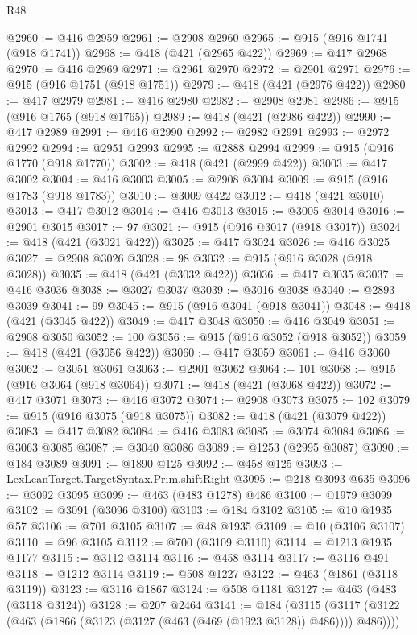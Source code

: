 \begin{lexlean}{R48}
\begin{coremodule}
@2960 := @416 @2959
@2961 := @2908 @2960
@2965 := @915 (@916 @1741 (@918 @1741))
@2968 := @418 (@421 (@2965 @422))
@2969 := @417 @2968
@2970 := @416 @2969
@2971 := @2961 @2970
@2972 := @2901 @2971
@2976 := @915 (@916 @1751 (@918 @1751))
@2979 := @418 (@421 (@2976 @422))
@2980 := @417 @2979
@2981 := @416 @2980
@2982 := @2908 @2981
@2986 := @915 (@916 @1765 (@918 @1765))
@2989 := @418 (@421 (@2986 @422))
@2990 := @417 @2989
@2991 := @416 @2990
@2992 := @2982 @2991
@2993 := @2972 @2992
@2994 := @2951 @2993
@2995 := @2888 @2994
@2999 := @915 (@916 @1770 (@918 @1770))
@3002 := @418 (@421 (@2999 @422))
@3003 := @417 @3002
@3004 := @416 @3003
@3005 := @2908 @3004
@3009 := @915 (@916 @1783 (@918 @1783))
@3010 := @3009 @422
@3012 := @418 (@421 @3010)
@3013 := @417 @3012
@3014 := @416 @3013
@3015 := @3005 @3014
@3016 := @2901 @3015
@3017 := 97
@3021 := @915 (@916 @3017 (@918 @3017))
@3024 := @418 (@421 (@3021 @422))
@3025 := @417 @3024
@3026 := @416 @3025
@3027 := @2908 @3026
@3028 := 98
@3032 := @915 (@916 @3028 (@918 @3028))
@3035 := @418 (@421 (@3032 @422))
@3036 := @417 @3035
@3037 := @416 @3036
@3038 := @3027 @3037
@3039 := @3016 @3038
@3040 := @2893 @3039
@3041 := 99
@3045 := @915 (@916 @3041 (@918 @3041))
@3048 := @418 (@421 (@3045 @422))
@3049 := @417 @3048
@3050 := @416 @3049
@3051 := @2908 @3050
@3052 := 100
@3056 := @915 (@916 @3052 (@918 @3052))
@3059 := @418 (@421 (@3056 @422))
@3060 := @417 @3059
@3061 := @416 @3060
@3062 := @3051 @3061
@3063 := @2901 @3062
@3064 := 101
@3068 := @915 (@916 @3064 (@918 @3064))
@3071 := @418 (@421 (@3068 @422))
@3072 := @417 @3071
@3073 := @416 @3072
@3074 := @2908 @3073
@3075 := 102
@3079 := @915 (@916 @3075 (@918 @3075))
@3082 := @418 (@421 (@3079 @422))
@3083 := @417 @3082
@3084 := @416 @3083
@3085 := @3074 @3084
@3086 := @3063 @3085
@3087 := @3040 @3086
@3089 := @1253 (@2995 @3087)
@3090 := @184 @3089
@3091 := @1890 @125
@3092 := @458 @125
@3093 := LexLeanTarget.TargetSyntax.Prim.shiftRight
@3095 := @218 @3093 @635
@3096 := @3092 @3095
@3099 := @463 (@483 @1278) @486
@3100 := @1979 @3099
@3102 := @3091 (@3096 @3100)
@3103 := @184 @3102
@3105 := @10 @1935 @57
@3106 := @701 @3105
@3107 := @48 @1935
@3109 := @10 (@3106 @3107)
@3110 := @96 @3105
@3112 := @700 (@3109 @3110)
@3114 := @1213 @1935 @1177
@3115 := @3112 @3114
@3116 := @458 @3114
@3117 := @3116 @491
@3118 := @1212 @3114
@3119 := @508 @1227
@3122 := @463 (@1861 (@3118 @3119))
@3123 := @3116 @1867
@3124 := @508 @1181
@3127 := @463 (@483 (@3118 @3124))
@3128 := @207 @2464
@3141 := @184
    (@3115 (@3117 (@3122 (@463 (@1866 (@3123 (@3127 (@463 (@469 (@1923 @3128)) @486)))) @486))))

\end{coremodule}
\end{lexlean}
